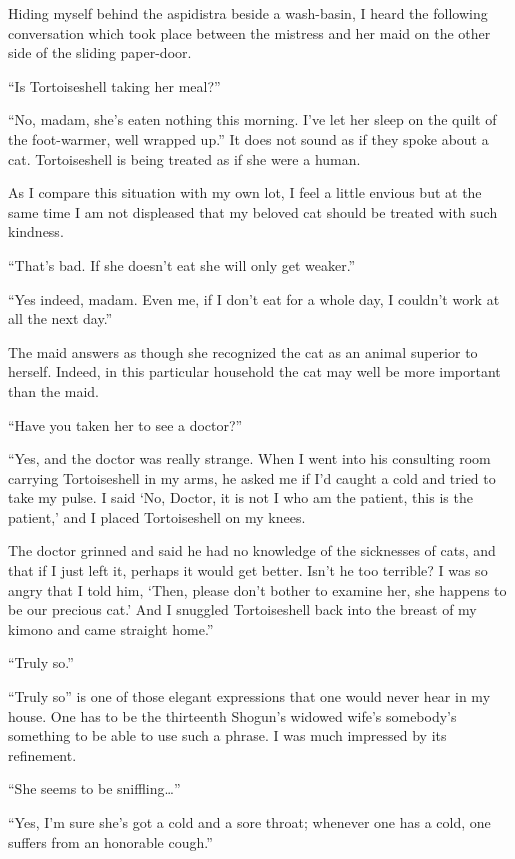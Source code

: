 \documentclass{book}
\begin{document}
Hiding myself behind the aspidistra beside a wash-basin, I heard the
following conversation which took place between the mistress and her
maid on the other side of the sliding paper-door.

``Is Tortoiseshell taking her meal?''

``No, madam, she's eaten nothing this morning. I've let her sleep on the
quilt of the foot-warmer, well wrapped up.'' It does not sound as if
they spoke about a cat. Tortoiseshell is being treated as if she were a
human.

As I compare this situation with my own lot, I feel a little envious but
at the same time I am not displeased that my beloved cat should be
treated with such kindness.

``That's bad. If she doesn't eat she will only get weaker.''

``Yes indeed, madam. Even me, if I don't eat for a whole day, I couldn't
work at all the next day.''

The maid answers as though she recognized the cat as an animal superior
to herself. Indeed, in this particular household the cat may well be
more important than the maid.

``Have you taken her to see a doctor?''

``Yes, and the doctor was really strange. When I went into his
consulting room carrying Tortoiseshell in my arms, he asked me if I'd
caught a cold and tried to take my pulse. I said `No, Doctor, it is not
I who am the patient, this is the patient,' and I placed Tortoiseshell
on my knees.

The doctor grinned and said he had no knowledge of the sicknesses of
cats, and that if I just left it, perhaps it would get better. Isn't he
too terrible? I was so angry that I told him, `Then, please don't bother
to examine her, she happens to be our precious cat.' And I snuggled
Tortoiseshell back into the breast of my kimono and came straight
home.''

``Truly so.''

``Truly so'' is one of those elegant expressions that one would never
hear in my house. One has to be the thirteenth Shogun's widowed wife's
somebody's something to be able to use such a phrase. I was much
impressed by its refinement.

``She seems to be sniffling\ldots{}''

``Yes, I'm sure she's got a cold and a sore throat; whenever one has a
cold, one suffers from an honorable cough.''
\end{document}
